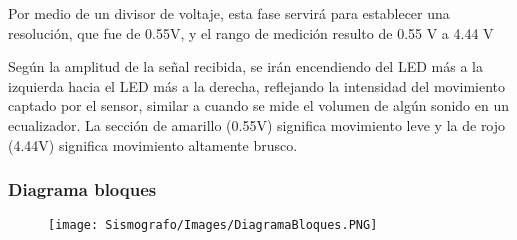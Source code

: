 \documentclass[12pt]{article}
\begin{document}
	        Por medio de un divisor de voltaje, esta fase servirá para establecer una resolución, que fue de 0.55V, y el rango de medición resulto de 0.55 V a 4.44 V
	        
	        Según la amplitud de la señal recibida, se irán encendiendo del LED más a la izquierda hacia el LED más a la derecha, reflejando la intensidad del movimiento captado por el sensor, similar a cuando se mide el volumen de algún sonido en un ecualizador. La sección de amarillo (0.55V) significa movimiento leve y la de rojo (4.44V) significa movimiento altamente brusco.
	        
	      
    
            \newpage
	        \subsubsection{Diagrama bloques}
	        
	        \begin{figure}[h!]
                \centering
                \texttt{[image: Sismografo/Images/DiagramaBloques.PNG]}
            \end{figure}
\end{document}
